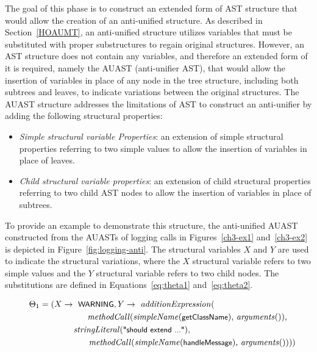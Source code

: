 

The goal of this phase is to construct an extended form of AST structure that would allow the creation of an anti-unified structure. As described in Section~\ref{HOAUMT}, an anti-unified structure utilizes variables that must be substituted with proper substructures to regain original structures. However, an AST structure does not contain any variables, and therefore an extended form of it is required, namely the AUAST (anti-unifier AST), that would allow the insertion of variables in place of any node in the tree structure, including both subtrees and leaves, to indicate variations between the original structures. The AUAST structure addresses the limitations of AST to construct an anti-unifier by adding the following structural properties:

\begin{itemize} [leftmargin=.5in]
\item \textit{Simple structural variable Properties}: an extension of simple structural properties referring to two simple values to allow the insertion of variables in place of leaves.
\end{itemize}
\begin{itemize} [leftmargin=.5in]
\item \textit{Child structural variable properties}: an extension of child structural properties referring to two child AST nodes to allow the insertion of variables in place of subtrees.
\end{itemize}


To provide an example to demonstrate this structure, the anti-unified AUAST constructed from the AUASTs of logging calls in Figures~\ref{ch3-ex1} and~\ref{ch3-ex2} is depicted in Figure~\ref{fig:logging-anti}. The structural variables $X$ and $Y$ are used to indicate the structural variations, where the $X$ structural variable refers to two simple values and the $Y$ structural variable refers to two child nodes. The substitutions are defined in Equations~\ref{eq:theta1} and~\ref{eq:theta2}.

\begin{align}
\Theta_1 = (X \rightarrow \text{ \textsf{\small WARNING}}, Y \rightarrow \text{ \textit{additionExpression}(}\hspace*{3cm}\nonumber\\
\text{\textit{methodCall}(\textit{simpleName}(\textsf{\small getClassName}), \textit{arguments}()),}\nonumber\\
\text{\textit{stringLiteral}(\textsf{\small "should extend ..."}),}\hspace*{4cm}\nonumber\\
\text{\textit{methodCall}(\textit{simpleName}(\textsf{\small handleMessage}), \textit{arguments}()))})\hspace*{-1em}\label{eq:theta1}
\end{align}

